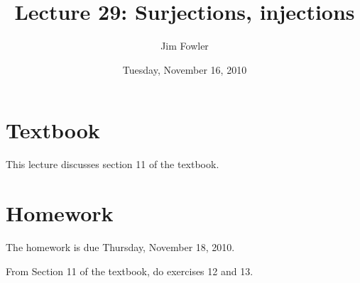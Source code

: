 \documentclass[12pt]{handout}
\title{Lecture 29: Surjections, injections}
\author{Jim Fowler}
\date{Tuesday, November 16, 2010}
\begin{document}
\maketitle

\section*{Textbook}

This lecture discusses section 11 of the textbook.


\section*{Homework} 





The homework is due Thursday, November 18, 2010.






From Section 11 of the textbook, do exercises 12 and 13.
\end{document}
